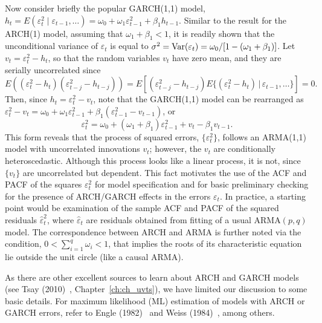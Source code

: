 Now consider briefly the popular GARCH(1,1) model, $h_t = E(\varepsilon_t^2 \;|\; \varepsilon_{t-1}, \ldots) = \omega_0 + \omega_1\varepsilon_{t-1}^2 + \beta_1h_{t-1}$. Similar to the result for the ARCH(1) model, assuming that $\omega_1 + \beta_1 < 1$, it is readily shown that the unconditional variance of $\varepsilon_t$ is equal to $\sigma^2 = \operatorname{Var}(\varepsilon_t) = \omega_0/[1 - (\omega_1 + \beta_1)]$. Let $v_t = \varepsilon_t^2 - h_t$, so that the random variables $v_t$ have zero mean, and they are serially uncorrelated since
	\[
	E( (\varepsilon_t^2 - h_t) (\varepsilon_{t-j}^2 - h_{t-j}) )= E[(\varepsilon_{t-j}^2 - h_{t-j}) E\{(\varepsilon_t^2 - h_t) \,|\, \varepsilon_{t-1},\ldots\}] = 0.
	\]
Then, since $h_t = \varepsilon_t^2 - v_t$, note that the GARCH(1,1) model can be rearranged as $\varepsilon_t^2 - v_t = \omega_0 + \omega_1\varepsilon_{t-1}^2 + \beta_1(\varepsilon_{t-1}^2 - v_{t-1})$, or
	\begin{equation} \label{eqn:2ept}
	\varepsilon_t^2 = \omega_0 + (\omega_1 + \beta_1)\varepsilon_{t-1}^2 + v_t - \beta_1v_{t-1}.
	\end{equation}
This form reveals that the process of squared errors, $\{\varepsilon_t^2\}$, follows an ARMA(1,1) model with uncorrelated innovations $v_t$; however, the $v_t$ are conditionally heteroscedastic. Although this process looks like a linear process, it is not, since $ \{ v_t \}$ are uncorrelated but dependent. This fact motivates the use of the ACF and PACF of the squares $\varepsilon_t^2$ for model specification and for basic preliminary checking for the presence of ARCH/GARCH effects in the errors $\varepsilon_t$. In practice, a starting point would be examination of the sample ACF and PACF of the squared residuals $\hat{\varepsilon}_t^2$, where $\hat{\varepsilon}_t$ are residuals obtained from fitting of a usual ARMA$(p,q)$ model. The correspondence between ARCH and ARMA is further noted via the condition, $0 < \sum_{i=1}^q \omega_i < 1$, that implies the roots of its characteristic equation lie outside the unit circle (like a causal ARMA).


As there are other excellent sources to learn about ARCH and GARCH models (see Tsay (2010)~\cite{tsay}, Chapter~\ref{ch:ch_uvts}), we have limited our discussion to some basic details. For maximum likelihood (ML) estimation of models with ARCH or GARCH errors, refer to Engle (1982)~\cite{engle1982} and Weiss (1984)~\cite{weiss1984}, among others. \twomedskip


